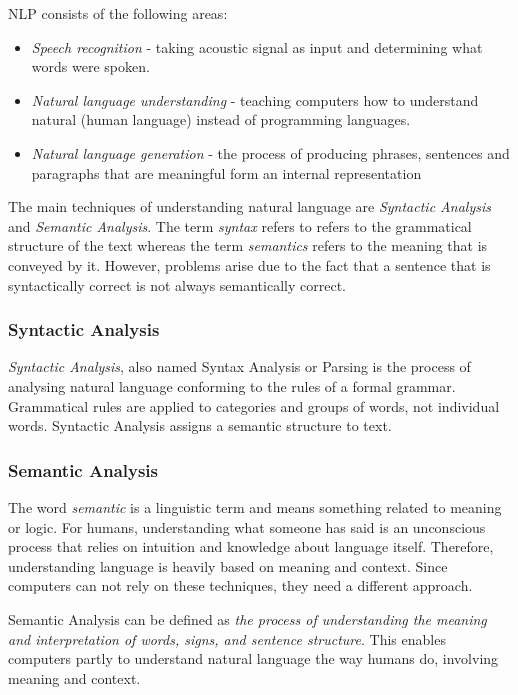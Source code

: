 \documentclass[12pt,a4paper]{article}
\begin{document}
NLP consists of the following areas:
\begin{itemize}
    \item \textit{Speech recognition} - taking acoustic signal as input and determining what words were spoken.
    \item \textit{Natural language understanding} - teaching computers how to understand natural (human language) instead of programming languages.
    \item \textit{Natural language generation} - the process of producing phrases, sentences and paragraphs that are meaningful form an internal representation \cite{Khurana2017}
\end{itemize}

The main techniques of understanding natural language are \textit{Syntactic Analysis} and \textit{Semantic Analysis}. The term \textit{syntax} refers to refers to the grammatical structure of the text whereas the term \textit{semantics} refers to the meaning that is conveyed by it. However, problems arise due to the fact that a sentence that is syntactically correct is not always semantically correct.

\subsubsection{Syntactic Analysis}
\textit{Syntactic Analysis}, also named Syntax Analysis or Parsing is the process of analysing natural language conforming to the rules of a formal grammar. Grammatical rules are applied to categories and groups of words, not individual words. Syntactic Analysis assigns a semantic structure to text.

\subsubsection{Semantic Analysis}
The word \textit{semantic} is a linguistic term and means something related to meaning or logic.
For humans, understanding what someone has said is an unconscious process that relies on intuition and knowledge about language itself. Therefore, understanding language is heavily based on meaning and context. Since computers can not rely on these techniques, they need a different approach.

Semantic Analysis can be defined as \textit{the process of understanding the meaning and interpretation of words, signs, and sentence structure}. This enables computers partly to understand natural language the way humans do, involving meaning and context.
\end{document}
